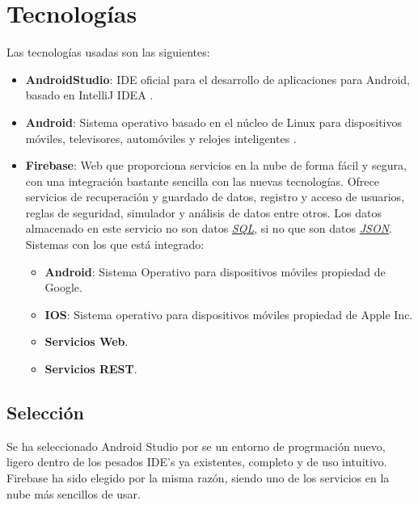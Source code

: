 \section{Tecnologías}
	Las tecnologías usadas son las siguientes:
	\begin{itemize}
		\item {\bf AndroidStudio}\cite{1:androidstudio:online}: IDE\cite{12:ide:online} oficial para el desarrollo de aplicaciones para Android, basado en IntelliJ IDEA \cite{3:intellij:online}.
		\item {\bf Android}\cite{2:android:online}: Sistema operativo basado en el núcleo de Linux \cite{4:nucleolinux:online} para dispositivos móviles, televisores, automóviles y relojes inteligentes \cite{5:wearables:online}.
		\item {\bf Firebase}\cite{6:firebase:online}: Web que proporciona servicios en la nube de forma fácil y segura, con una integración bastante sencilla con las nuevas tecnologías. Ofrece servicios de recuperación y guardado de datos, registro y acceso de usuarios, reglas de seguridad, simulador y análisis de datos entre otros. Los datos almacenado en este servicio no son datos \href{http://es.wikipedia.org/wiki/SQL}{\textit{SQL}}\cite{8:jquery:online}\cite{9:jquery:online}, si no que son datos \href{http://es.wikipedia.org/wiki/JSON}{\textit{JSON}}\cite{7:json:online}. Sistemas con los que está integrado:
		\begin{itemize}
			\item {\bf Android}\cite{2:android:online}: Sistema Operativo para dispositivos móviles propiedad de Google.
			\item {\bf IOS}\cite{10:ios:online}: Sistema operativo para dispositivos móviles propiedad de Apple Inc.
			\item {\bf Servicios Web}.
			\item {\bf Servicios REST}\cite{11:rest:online}.
		\end{itemize}
	\end{itemize}
	
	\subsection{Selección}
	Se ha seleccionado Android Studio por se un entorno de progrmación nuevo, ligero dentro de los pesados IDE's ya existentes, completo y de uso intuitivo. Firebase ha sido elegido por la misma razón, siendo uno de los servicios en la nube más sencillos de usar.
	
